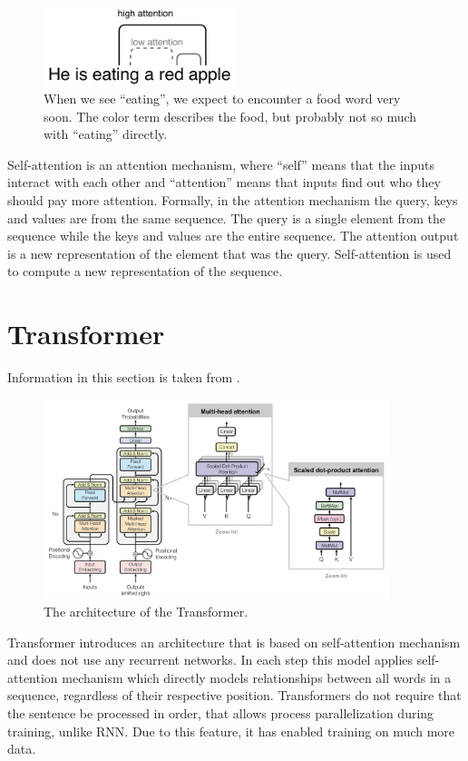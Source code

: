 \begin{figure}[hbt]
  \centering
  \includegraphics[width=0.5\textwidth]{figures/attention.pdf}
  \caption{When we see ``eating'', we expect to encounter a food word very soon. The color term describes the food, but probably not so much with ``eating'' directly.}
  \label{attention}
\end{figure}

Self-attention is an attention mechanism, where ``self'' means that the inputs interact with each other and ``attention'' means that inputs find out who they should pay more attention. Formally, in the attention mechanism the query, keys and values are from the same sequence. The query is a single element from the sequence while the keys and values are the entire sequence. The attention output is a new representation of the element that was the query. Self-attention is used to compute a new representation of the sequence.  

\section{Transformer} 
Information in this section is taken from \cite{vaswani2017attention}.
\begin{figure}[hbt]
  \centering
  \includegraphics[width=0.9\textwidth]{figures/transformer_attention.png}
  \caption[Transformer architecture]{The architecture of the Transformer.\protect\footnotemark}
  \label{transformer}
\end{figure}

Transformer introduces an architecture that is based on self-attention mechanism and does not use any recurrent networks. In each step this model applies self-attention mechanism which directly models relationships between all words in a sequence, regardless of their respective position. Transformers do not require that the sentence be processed in order, that allows process parallelization during training, unlike RNN. Due to this feature, it has enabled training on much more data. 

